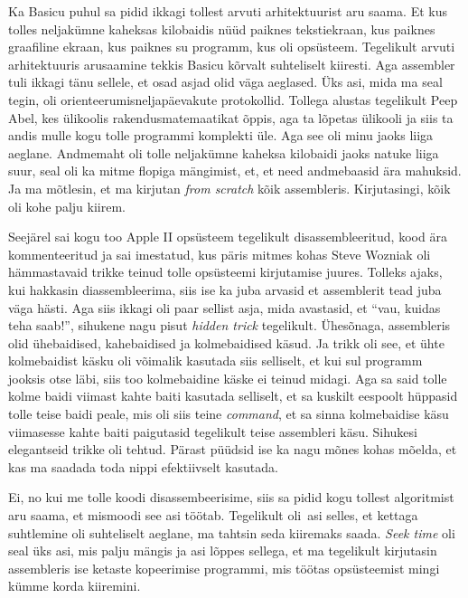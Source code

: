 
Ka Basicu puhul sa pidid ikkagi tollest arvuti arhitektuurist aru saama. Et kus tolles neljakümne kaheksas kilobaidis nüüd paiknes tekstiekraan, kus paiknes graafiline ekraan, kus paiknes su programm, kus oli opsüsteem. Tegelikult arvuti arhitektuuris arusaamine tekkis Basicu kõrvalt suhteliselt kiiresti. Aga assembler tuli ikkagi tänu sellele, et osad asjad olid väga aeglased. Üks asi, mida ma seal tegin, oli orienteerumisneljapäevakute protokollid. Tollega alustas tegelikult Peep Abel, kes ülikoolis rakendusmatemaatikat õppis, aga ta lõpetas ülikooli ja siis ta andis mulle kogu tolle programmi komplekti üle. Aga see oli minu jaoks liiga aeglane. Andmemaht oli tolle  neljakümne kaheksa kilobaidi jaoks natuke liiga suur, seal oli ka mitme flopiga mängimist, et, et need andmebaasid ära mahuksid. Ja ma mõtlesin, et ma kirjutan \emph{from scratch} kõik assembleris. Kirjutasingi, kõik oli kohe palju kiirem. 

Seejärel sai kogu too Apple II opsüsteem tegelikult disassembleeritud, kood ära kommenteeritud ja sai imestatud, kus päris mitmes kohas Steve Wozniak oli hämmastavaid trikke teinud tolle opsüsteemi kirjutamise juures. Tolleks ajaks, kui hakkasin diassembleerima, siis ise ka juba arvasid et assemblerit tead juba väga hästi. Aga siis ikkagi oli paar sellist asja, mida avastasid, et \enquote{vau, kuidas teha saab!}, sihukene nagu  pisut \emph{hidden trick} tegelikult. Ühesõnaga, assembleris olid ühebaidised, kahebaidised ja kolmebaidised käsud. Ja trikk oli see, et ühte kolmebaidist käsku oli võimalik kasutada siis selliselt, et kui sul programm jooksis otse läbi, siis too kolmebaidine käske ei teinud midagi. Aga sa said tolle kolme baidi viimast kahte baiti kasutada selliselt, et sa kuskilt eespoolt hüppasid tolle teise baidi peale, mis oli siis teine \emph{command}, et sa sinna kolmebaidise käsu viimasesse kahte baiti paigutasid tegelikult teise assembleri käsu. Sihukesi elegantseid trikke oli tehtud. Pärast püüdsid ise ka nagu mõnes kohas mõelda, et kas ma saadada toda nippi efektiivselt kasutada.


Ei, no kui me tolle koodi disassembeerisime, siis sa pidid kogu tollest algoritmist aru saama, et mismoodi see asi töötab. Tegelikult oli asi selles, et kettaga suhtlemine oli suhteliselt aeglane, ma tahtsin seda kiiremaks saada. \emph{Seek time} oli seal üks asi, mis palju mängis ja asi lõppes sellega, et ma tegelikult kirjutasin assembleris ise ketaste kopeerimise programmi, mis töötas   opsüsteemist mingi kümme korda kiiremini. 

